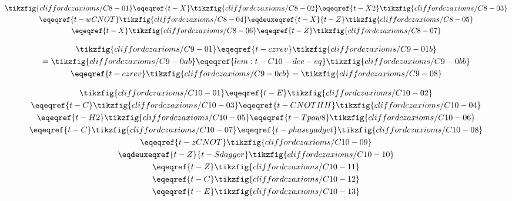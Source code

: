 \begin{derivation}\label{lem:t-C10-dec-eq}
\begin{gather*}
    \tikzfig{cliffordczaxioms/C8-01}
    \eqeqref{t-X}\tikzfig{cliffordczaxioms/C8-02}
    \eqeqref{t-X2}\tikzfig{cliffordczaxioms/C8-03}\\
    \eqeqref{t-wCNOT}\tikzfig{cliffordczaxioms/C8-04}
    \eqdeuxeqref{t-X}{t-Z}\tikzfig{cliffordczaxioms/C8-05}\\
    \eqeqref{t-X}\tikzfig{cliffordczaxioms/C8-06}
    \eqeqref{t-Z}\tikzfig{cliffordczaxioms/C8-07}
\end{gather*}
\end{derivation}

\begin{derivation}\label{lem:t-C11-dec-eq}
\begin{gather*}
    \tikzfig{cliffordczaxioms/C9-01}
    \eqeqref{t-czrev}\tikzfig{cliffordczaxioms/C9-01b}\\
    =\tikzfig{cliffordczaxioms/C9-0ab}
    \eqeqref{lem:t-C10-dec-eq}\tikzfig{cliffordczaxioms/C9-0bb}\\
    \eqeqref{t-czrev}\tikzfig{cliffordczaxioms/C9-0cb}
    =\tikzfig{cliffordczaxioms/C9-08}
\end{gather*}
\end{derivation}

\begin{derivation}\label{lem:t-C12-dec-eq}
\begin{gather*}
    \tikzfig{cliffordczaxioms/C10-01}
    \eqeqref{t-E}\tikzfig{cliffordczaxioms/C10-02}\\
    \eqeqref{t-C}\tikzfig{cliffordczaxioms/C10-03}
    \eqeqref{t-CNOTHH}\tikzfig{cliffordczaxioms/C10-04}\\
    \eqeqref{t-H2}\tikzfig{cliffordczaxioms/C10-05}
    \eqeqref{t-Tpow8}\tikzfig{cliffordczaxioms/C10-06}\\
    \eqeqref{t-C}\tikzfig{cliffordczaxioms/C10-07}
    \eqeqref{t-phasegadget}\tikzfig{cliffordczaxioms/C10-08}\\
    \eqeqref{t-zCNOT}\tikzfig{cliffordczaxioms/C10-09}\\
    \eqdeuxeqref{t-Z}{t-Sdagger}\tikzfig{cliffordczaxioms/C10-10}\\
    \eqeqref{t-Z}\tikzfig{cliffordczaxioms/C10-11}\\
    \eqeqref{t-C}\tikzfig{cliffordczaxioms/C10-12}\\
    \eqeqref{t-E}\tikzfig{cliffordczaxioms/C10-13}
\end{gather*}
\end{derivation}

